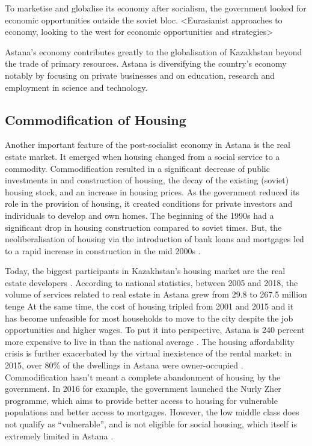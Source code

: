 \documentclass{article}
\begin{document}
To marketise and globalise its economy after socialism, the government looked for economic opportunities outside the soviet bloc. 
<Eurasianist approaches to economy, looking to the west for economic opportunities and strategies>
 
Astana's economy contributes greatly to the globalisation of Kazakhstan beyond the trade of primary resources. Astana is diversifying the country's economy notably by focusing on private businesses and on education, research and employment in science and technology.

\subsection{Commodification of Housing}

Another important feature of the post-socialist economy in Astana is the real estate market. It emerged when housing changed from a social service to a commodity. Commodification resulted in a significant decrease of public investments in and construction of housing, the decay of the existing (soviet) housing stock, and an increase in housing prices. 
As the government reduced its role in the provision of housing, it created conditions for private investors and individuals to develop and own homes. The beginning of the 1990s had a significant drop in housing construction compared to soviet times. But, the neoliberalisation of housing via the introduction of bank loans and mortgages led to a rapid increase in construction in the mid 2000s \parencite{unece2018housing}.

Today, the biggest participants in Kazakhstan's housing market are the real estate developers \parencite{unece2018housing}. According to national statistics, between 2005 and 2018, the volume of services related to real estate in Astana grew from 29.8 to 267.5 million tenge %
At the same time, the cost of housing tripled from 2001 and 2015 \parencite{seitz2021urbanization} and it has become unfeasible for most households to move to the city despite the job opportunities and higher wages. To put it into perspective, Astana is 240 percent more expensive to live in than the national average \parencite{seitz2021urbanization}. The housing affordability crisis is further exacerbated by the virtual inexistence of the rental market: in 2015, over 80\% of the dwellings in Astana were owner-occupied \parencite{seitz2021urbanization}.
Commodification hasn't meant a complete abandonment of housing by the government. In 2016 for example, the government launched the Nurly Zher programme, which aims to provide better access to housing for vulnerable populations and better access to mortgages. However, the low middle class does not qualify as ``vulnerable'', and is not eligible for social housing, which itself is extremely limited in Astana \parencite{?}.
\end{document}
